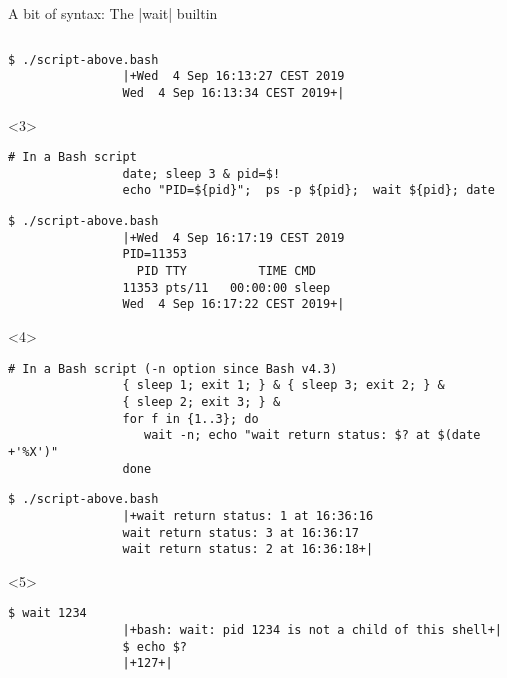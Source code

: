 \begin{frame}[fragile]{A bit of syntax: The \bash|wait| builtin}
\begin{overlayarea}{\textwidth}{0.7\textheight}
\begin{onlyenv}
\begin{lstlisting}[style=MyBash, numbers=none, aboveskip=3mm]
            \end{lstlisting}
            \begin{lstlisting}[style=MyBash, numbers=none, aboveskip=1mm]
                $ ./script-above.bash
                |+Wed  4 Sep 16:13:27 CEST 2019
                Wed  4 Sep 16:13:34 CEST 2019+|
            \end{lstlisting}
        \end{onlyenv}
        \begin{onlyenv}<3>
            \begin{lstlisting}[style=MyBash, numbers=none, aboveskip=3mm]
                # In a Bash script
                date; sleep 3 & pid=$!
                echo "PID=${pid}";  ps -p ${pid};  wait ${pid}; date
            \end{lstlisting}
            \begin{lstlisting}[style=MyBash, numbers=none, aboveskip=1mm]
                $ ./script-above.bash
                |+Wed  4 Sep 16:17:19 CEST 2019
                PID=11353
                  PID TTY          TIME CMD
                11353 pts/11   00:00:00 sleep
                Wed  4 Sep 16:17:22 CEST 2019+|
            \end{lstlisting}
        \end{onlyenv}
        \begin{onlyenv}<4>
            \begin{lstlisting}[style=MyBash, numbers=none, aboveskip=3mm]
                # In a Bash script (-n option since Bash v4.3)
                { sleep 1; exit 1; } & { sleep 3; exit 2; } &
                { sleep 2; exit 3; } &
                for f in {1..3}; do
                   wait -n; echo "wait return status: $? at $(date +'%X')"
                done
            \end{lstlisting}
            \begin{lstlisting}[style=MyBash, numbers=none, aboveskip=1mm]
                $ ./script-above.bash
                |+wait return status: 1 at 16:36:16
                wait return status: 3 at 16:36:17
                wait return status: 2 at 16:36:18+|
            \end{lstlisting}
        \end{onlyenv}
        \begin{onlyenv}<5>
            \begin{lstlisting}[style=MyBash, numbers=none, aboveskip=3mm]
                $ wait 1234
                |+bash: wait: pid 1234 is not a child of this shell+|
                $ echo $?
                |+127+|
            \end{lstlisting}
        \end{onlyenv}
    \end{overlayarea}
\end{frame}
